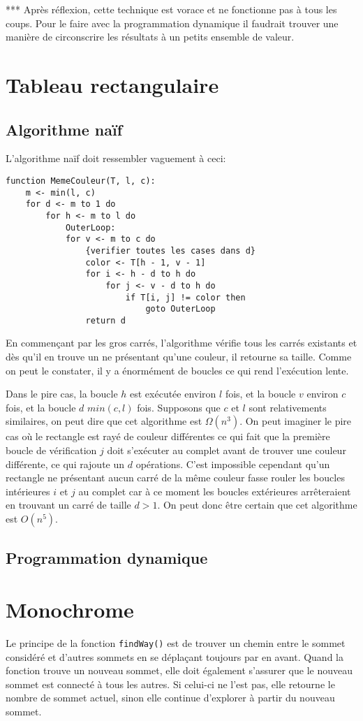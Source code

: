 \documentclass{article}
\begin{document}
*** Après réflexion, cette technique est vorace et ne fonctionne pas à tous les coups. Pour le faire avec la programmation dynamique il faudrait trouver une manière de circonscrire les résultats à un petits ensemble de valeur.

\section{Tableau rectangulaire}
\subsection{Algorithme naïf}
L'algorithme naïf doit ressembler vaguement à ceci:
\begin{lstlisting}
function MemeCouleur(T, l, c):
	m <- min(l, c)
	for d <- m to 1 do
		for h <- m to l do
			OuterLoop:
			for v <- m to c do
				{verifier toutes les cases dans d}
				color <- T[h - 1, v - 1]
				for i <- h - d to h do
					for j <- v - d to h do
						if T[i, j] != color then
							goto OuterLoop
				return d
\end{lstlisting}
En commençant par les gros carrés, l'algorithme vérifie tous les carrés existants et dès qu'il en trouve un ne présentant qu'une couleur, il retourne sa taille. Comme on peut le constater, il y a énormément de boucles ce qui rend l'exécution lente.

Dans le pire cas, la boucle $h$ est exécutée environ $l$ fois, et la boucle $v$ environ $c$ fois, et la boucle $d$ $min(c, l)$ fois. Supposons que $c$ et $l$ sont relativements similaires, on peut dire que cet algorithme est $\Omega(n^3)$. On peut imaginer le pire cas où le rectangle est rayé de couleur différentes ce qui fait que la première boucle de vérification $j$ doit s'exécuter au complet avant de trouver une couleur différente, ce qui rajoute un $d$ opérations. C'est impossible cependant qu'un rectangle ne présentant aucun carré de la même couleur fasse rouler les boucles intérieures $i$ et $j$ au complet car à ce moment les boucles extérieures arrêteraient en trouvant un carré de taille $d > 1$. On peut donc être certain que cet algorithme est $O(n^5)$.

\subsection{Programmation dynamique}

\section{Monochrome}
Le principe de la fonction \texttt{findWay()} est de trouver un chemin entre le sommet considéré et d'autres sommets en se déplaçant toujours par en avant. Quand la fonction trouve un nouveau sommet, elle doit également s'assurer que le nouveau sommet est connecté à tous les autres. Si celui-ci ne l'est pas, elle retourne le nombre de sommet actuel, sinon elle continue d'explorer à partir du nouveau sommet.
\end{document}

